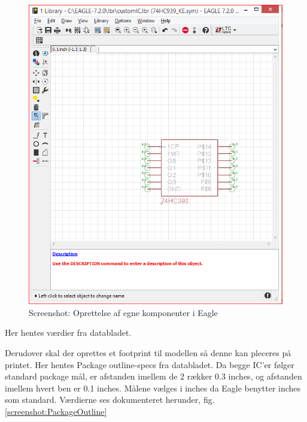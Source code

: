 \begin{figure}[H]
	\centering
	\includegraphics[scale=0.6]{../Hardware/Shields/Screenshots/OprettelseAfEgneKomponenter}
	\caption{Screenshot: Oprettelse af egne komponenter i Eagle}
	\label{screenshot:EagleComponents}
\end{figure}

Her hentes værdier fra databladet.

Derudover skal der oprettes et footprint til modellen så denne kan pleceres på printet. Her hentes Package outline-specs fra databladet. Da begge IC'er følger standard package mål, er afstanden imellem de 2 rækker 0.3 inches, og afstanden imellem hvert ben er 0.1 inches. 
Målene vælges i inches da Eagle benytter inches som standard. Værdierne ses dokumenteret herunder, fig.\ref{screenshot:PackageOutline} 

